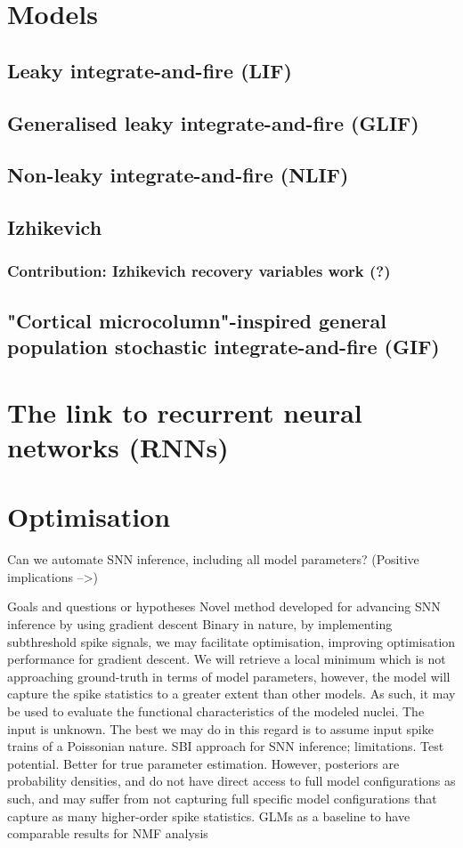 \documentclass[mphil,deptreport,ai]{infthesis} %
\begin{document}
\section{Models}

\subsection{Leaky integrate-and-fire (LIF)}

\subsection{Generalised leaky integrate-and-fire (GLIF)}

\subsection{Non-leaky integrate-and-fire (NLIF)}

\subsection{Izhikevich}
\subsubsection{Contribution: Izhikevich recovery variables work (?)}

\subsection{"Cortical microcolumn"-inspired general population stochastic integrate-and-fire (GIF)}


\section{The link to recurrent neural networks (RNNs)}


\section{Optimisation}
Can we automate SNN inference, including all model parameters? (Positive implications -->)

Goals and questions or hypotheses
Novel method developed for advancing SNN inference by using gradient descent
Binary in nature, by implementing subthreshold spike signals, we may facilitate optimisation, improving optimisation performance for gradient descent.
We will retrieve a local minimum which is not approaching ground-truth in terms of model parameters, however, the model will capture the spike statistics to a greater extent than other models. As such, it may be used to evaluate the functional characteristics of the modeled nuclei.
The input is unknown. The best we may do in this regard is to assume input spike trains of a Poissonian nature.
SBI approach for SNN inference; limitations. Test potential.
Better for true parameter estimation. However,  posteriors are probability densities, and do not have direct access to full model configurations as such, and may suffer from not capturing full specific model configurations that capture as many higher-order spike statistics.
GLMs as a baseline to have comparable results for NMF analysis
\end{document}
